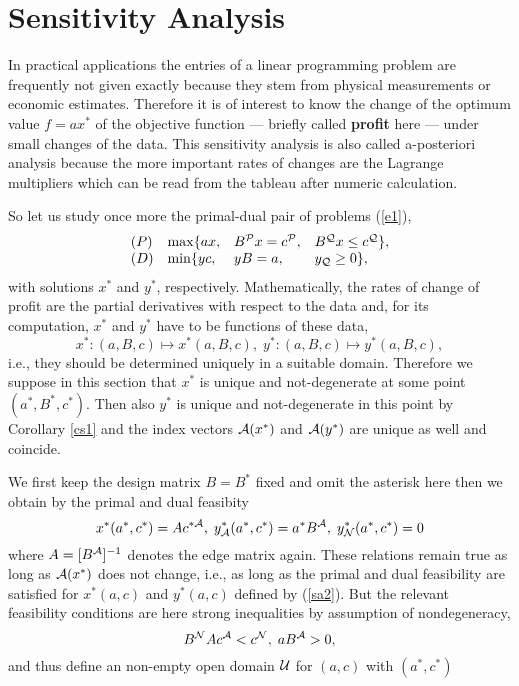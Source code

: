 \section{Sensitivity Analysis}
In practical applications the entries of a linear programming problem are
frequently not given exactly because they stem from physical measurements
or economic estimates. Therefore it is of interest to know the change of
the optimum value $f = ax^*$ of the objective function --- briefly called
{\bf profit} here --- under small changes of the data.  This sensitivity
analysis is also called a-posteriori analysis because the more important rates
of changes are the {\sc Lagrange} multipliers which can be read from the
tableau after numeric calculation.
\par
So let us study once more the primal-dual pair of problems (\ref{e1}),
%
\begin{equation} \label{sa1}
\ba{.}{llll}
(P) &\max \{ax, & B^{\P}x = c^{\P}, & B^{\Q}x \leq c^{\Q}\},\\
(D) &\min \{yc, & yB = a,           & y_{\Q} \geq 0\},
\ea{.}
\end{equation}
%
with solutions $x^*$ and $y^*$, respectively.
Mathematically, the rates of change of profit are the partial derivatives
with respect to the data and, for its computation,  $x^*$ and $y^*$ have to be
functions of these data,
%
\[
x^*: (a,B,c) \mapsto x^*(a,B,c), \;
y^*: (a,B,c) \mapsto y^*(a,B,c),
\]
%
i.e., they should be determined uniquely in a suitable domain.  Therefore we
suppose in this section that $x^*$ is unique and not-degenerate at some point
$(a^*,B^*,c^*)$.  Then also $y^*$ is unique and not-degenerate in this point by
Corollary \ref{cs1} and the index vectors $\A(x^*)$ and $\A(y^*)$ are unique
as well and coincide.
\par
We first keep the design matrix $B = B^*$ fixed and omit the asterisk here then
we obtain by the primal and dual feasibity
%
\begin{equation} \label{sa2}
x^*(a^*,c^*) = Ac^{*\A}, \; y^*_{\A}(a^*,c^*) = a^*B^{\A}, \;
y^*_{\N}(a^*,c^*)   = 0
\end{equation}
%
where $A = [B^{\A}]^{-1}$ denotes the edge matrix again.  These relations
remain true as long as $\A(x^*)$ does not change, i.e., as long as the primal
and dual feasibility are satisfied for $x^*(a,c)$ and $y^*(a,c)$ defined
by (\ref{sa2}).  But the relevant feasibility conditions are here strong
inequalities by assumption of nondegeneracy,
\[
B^{\N}Ac^{\A} < c^{\N}, \;  aB^{\A} > 0,
\]
and thus define an non-empty open domain $\U$ for $(a,c)$ with $(a^*,c^*)$
